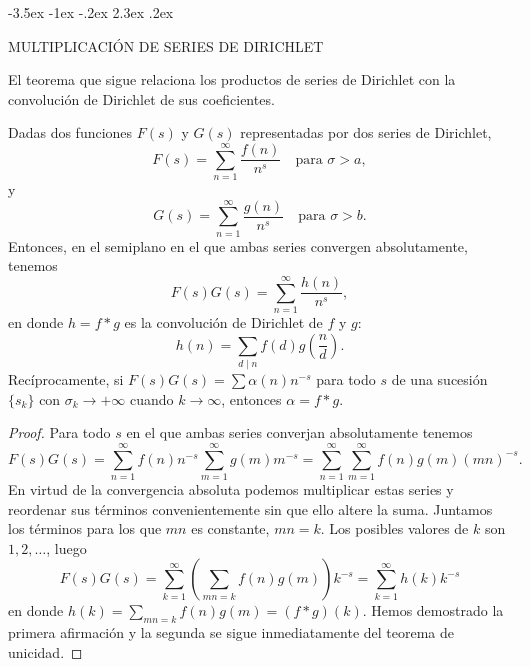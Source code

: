 \documentclass[12pt,a4paper]{book}
\makeatletter
\renewcommand\section{\@startsection{section}{1}{\z@}%
  {-3.5ex \@plus -1ex \@minus -.2ex}%
  {2.3ex \@plus .2ex}%
  {\normalfont\Large\bfseries\raggedright}}
\makeatother
\begin{document}
    \section{MULTIPLICACIÓN DE SERIES DE DIRICHLET}

    El teorema que sigue relaciona los productos de series de Dirichlet con la convolución de
    Dirichlet de sus coeficientes.

    \begin{teorema}\label{teo:11-5}
        Dadas dos funciones $F(s)$ y $G(s)$ representadas por dos series de Dirichlet,
        \begin{equation*}
            F(s)=\sum_{n=1}^{\infty}\frac{f(n)}{n^{s}}\quad\text{para }\sigma>a,
        \end{equation*}
        y
        \begin{equation*}
            G(s)=\sum_{n=1}^{\infty}\frac{g(n)}{n^{s}}\quad\text{para }\sigma>b.
        \end{equation*}
        Entonces, en el semiplano en el que ambas series convergen absolutamente, tenemos
        \begin{equation}\label{eq:11-5}
            F(s)G(s)=\sum_{n=1}^{\infty}\frac{h(n)}{n^{s}},
        \end{equation}
        en donde $h=f*g$ es la convolución de Dirichlet de $f$ y $g$:
        \begin{equation*}
            h(n)=\sum_{d\mid n}f(d)g\left(\frac{n}{d}\right).
        \end{equation*}
        Recíprocamente, si $F(s)G(s)=\sum\alpha(n)n^{-s}$ para todo $s$ de una sucesión
        $\{s_{k}\}$ con $\sigma_{k}\to+\infty$ cuando $k\to\infty$, entonces $\alpha=f*g$.
    \end{teorema}

    \begin{proof}
        Para todo $s$ en el que ambas series converjan absolutamente tenemos
        \begin{equation*}
            F(s)G(s)=\sum_{n=1}^{\infty}f(n)n^{-s}\sum_{m=1}^{\infty}g(m)m^{-s}
            =\sum_{n=1}^{\infty}\sum_{m=1}^{\infty}f(n)g(m)(mn)^{-s}.
        \end{equation*}
        En virtud de la convergencia absoluta podemos multiplicar estas series y reordenar
        sus términos convenientemente sin que ello altere la suma. Juntamos los términos para
        los que $mn$ es constante, $mn=k$. Los posibles valores de $k$ son $1,2,\dots$, luego
        \begin{equation*}
            F(s)G(s)=\sum_{k=1}^{\infty}\left(\sum_{mn=k}f(n)g(m)\right)k^{-s}=\sum_{k=1}^{\infty}h(k)k^{-s}
        \end{equation*}
        en donde $h(k)=\sum_{mn=k}f(n)g(m)=(f*g)(k)$. Hemos demostrado la primera afirmación y
        la segunda se sigue inmediatamente del teorema de unicidad.
    \end{proof}
\end{document}
